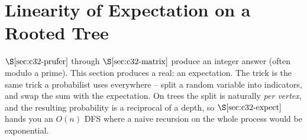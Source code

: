 \section{Linearity of Expectation on a Rooted Tree}\label{sec:c32-expect}

\begin{previouslybox}
\(\secref{c32-prufer}\) through \(\secref{c32-matrix}\) produce an integer
answer (often modulo a prime).  This section produces a real: an expectation.
The trick is the same trick a probabilist uses everywhere -- split a random
variable into indicators, and swap the sum with the expectation.  On trees
the split is naturally \emph{per vertex}, and the resulting probability is a
reciprocal of a depth, so \(\secref{c32-expect}\) hands you an \(O(n)\) DFS
where a naive recursion on the whole process would be exponential.
\end{previouslybox}

